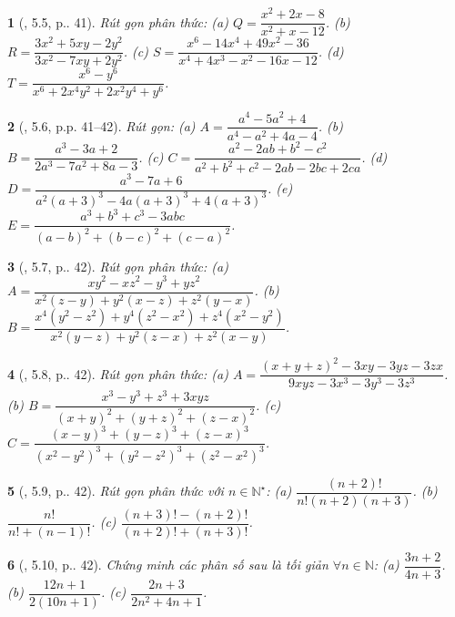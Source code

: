 \documentclass{article}
\newtheorem{baitoan}{}
\begin{document}
\begin{baitoan}[\cite{TLCT_THCS_Toan_8_dai_so}, 5.5, p.. 41]
	Rút gọn phân thức: (a) $Q = \dfrac{x^2 + 2x - 8}{x^2 + x - 12}$. (b) $R = \dfrac{3x^2 + 5xy - 2y^2}{3x^2 - 7xy + 2y^2}$. (c) $S = \dfrac{x^6 - 14x^4 + 49x^2 - 36}{x^4 + 4x^3 - x^2 - 16x - 12}$. (d) $T = \dfrac{x^6 - y^6}{x^6 + 2x^4y^2 + 2x^2y^4 + y^6}$.	
\end{baitoan}

\begin{baitoan}[\cite{TLCT_THCS_Toan_8_dai_so}, 5.6, p.p. 41--42]
	Rút gọn: (a) $A = \dfrac{a^4 - 5a^2 + 4}{a^4 - a^2 + 4a - 4}$. (b) $B = \dfrac{a^3 - 3a + 2}{2a^3 - 7a^2 + 8a - 3}$. (c) $C = \dfrac{a^2 - 2ab + b^2 - c^2}{a^2 + b^2 + c^2 - 2ab - 2bc + 2ca}$. (d) $D = \dfrac{a^3 - 7a + 6}{a^2(a + 3)^3 - 4a(a + 3)^3 + 4(a + 3)^3}$. (e) $E = \dfrac{a^3 + b^3 + c^3 - 3abc}{(a - b)^2 + (b - c)^2 + (c - a)^2}$.	
\end{baitoan}

\begin{baitoan}[\cite{TLCT_THCS_Toan_8_dai_so}, 5.7, p.. 42]
	Rút gọn phân thức: (a) $A = \dfrac{xy^2 - xz^2 - y^3 + yz^2}{x^2(z - y) + y^2(x - z) + z^2(y - x)}$. (b) $B = \dfrac{x^4(y^2 - z^2) + y^4(z^2 - x^2) + z^4(x^2 - y^2)}{x^2(y - z) + y^2(z - x) + z^2(x - y)}$.	
\end{baitoan}

\begin{baitoan}[\cite{TLCT_THCS_Toan_8_dai_so}, 5.8, p.. 42]
	Rút gọn phân thức: (a) $A = \dfrac{(x + y + z)^2 - 3xy - 3yz - 3zx}{9xyz - 3x^3 - 3y^3 - 3z^3}$. (b) $B = \dfrac{x^3 - y^3 + z^3 + 3xyz}{(x + y)^2 + (y + z)^2 + (z - x)^2}$. (c) $C = \dfrac{(x - y)^3 + (y - z)^3 + (z - x)^3}{(x^2 - y^2)^3 + (y^2 - z^2)^3 + (z^2 - x^2)^3}$.	
\end{baitoan}

\begin{baitoan}[\cite{TLCT_THCS_Toan_8_dai_so}, 5.9, p.. 42]
	Rút gọn phân thức với $n\in\mathbb{N}^\star$: (a) $\dfrac{(n + 2)!}{n!(n + 2)(n + 3)}$. (b) $\dfrac{n!}{n! + (n - 1)!}$. (c) $\dfrac{(n + 3)! - (n + 2)!}{(n + 2)! + (n + 3)!}$.	
\end{baitoan}

\begin{baitoan}[\cite{TLCT_THCS_Toan_8_dai_so}, 5.10, p.. 42]
	Chứng minh các phân số sau là tối giản $\forall n\in\mathbb{N}$: (a) $\dfrac{3n + 2}{4n + 3}$. (b) $\dfrac{12n + 1}{2(10n + 1)}$. (c) $\dfrac{2n + 3}{2n^2 + 4n + 1}$.	
\end{baitoan}
\end{document}
